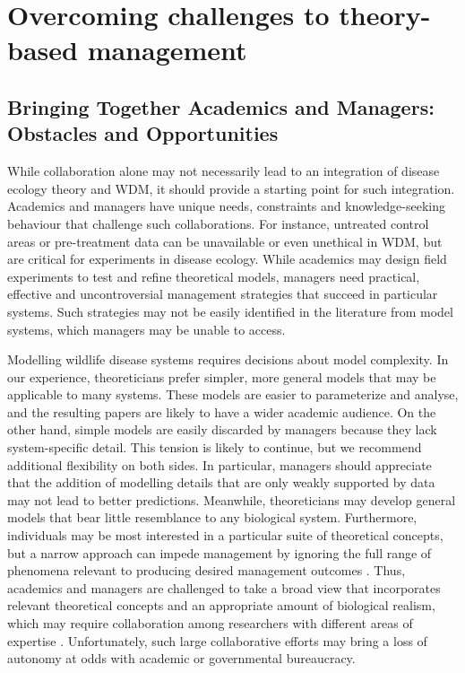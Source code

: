 \section{Overcoming challenges to theory-based management}

\subsection{Bringing Together Academics and Managers: Obstacles and Opportunities}

While collaboration alone may not necessarily lead to an integration of disease ecology theory and WDM, it should provide a starting point for such integration.
Academics and managers have unique needs, constraints and knowledge-seeking behaviour that challenge such collaborations.
For instance, untreated control areas or pre-treatment data can be unavailable or even unethical in WDM, but are critical for experiments in disease ecology.
While academics may design field experiments to test and refine theoretical models, managers need practical, effective and uncontroversial management strategies that succeed in particular systems.
Such strategies may not be easily identified in the literature from model systems, which managers may be unable to access.

Modelling wildlife disease systems requires decisions about model complexity.
In our experience, theoreticians prefer simpler, more general models that may be applicable to many systems.
These models are easier to parameterize and analyse, and the resulting papers are likely to have a wider academic audience.
On the other hand, simple models are easily discarded by managers because they lack system-specific detail.
This tension is likely to continue, but we recommend additional flexibility on both sides.
In particular, managers should appreciate that the addition of modelling details that are only weakly supported by data may not lead to better predictions.
Meanwhile, theoreticians may develop general models that bear little resemblance to any biological system.
Furthermore, individuals may be most interested in a particular suite of theoretical concepts, but a narrow approach can impede management by ignoring the full range of phenomena relevant to producing desired management outcomes \citep{driscoll2012framework}.
Thus, academics and managers are challenged to take a broad view that incorporates relevant theoretical concepts and an appropriate amount of biological realism, which may require collaboration among researchers with different areas of expertise \citep{driscoll2012framework}.
Unfortunately, such large collaborative efforts may bring a loss of autonomy at odds with academic or governmental bureaucracy.

